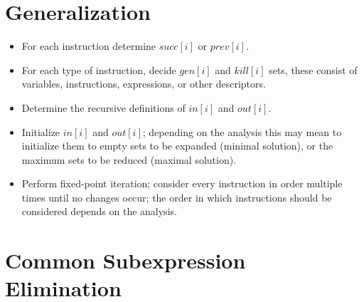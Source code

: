 \section{Generalization}

\begin{itemize}

\item For each instruction determine $succ[i]$ or $prev[i]$.

\item For each type of instruction, decide $gen[i]$ and $kill[i]$ sets, these
consist of variables, instructions, expressions, or other descriptors.

\item Determine the recursive definitions of $in[i]$ and $out[i]$.

\item Initialize $in[i]$ and $out[i]$; depending on the analysis this may mean
to initialize them to empty sets to be expanded (minimal solution), or the
maximum sets to be reduced (maximal solution).

\item Perform fixed-point iteration; consider every instruction in order
multiple times until no changes occur; the order in which instructions should
be considered depends on the analysis.

\end{itemize}

\section{Common Subexpression Elimination}

